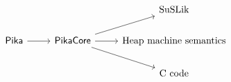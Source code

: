 \[\begin{tikzcd}
	&& {\textnormal{\SuSLik}} \\
	{\Pika} & {\PikaCore} & {\textnormal{Heap machine semantics}} \\
	&& {\textnormal{C code}}
	\arrow[from=2-1, to=2-2]
	\arrow[from=2-2, to=1-3]
	\arrow[from=2-2, to=2-3]
	\arrow[from=2-2, to=3-3]
\end{tikzcd}\]
